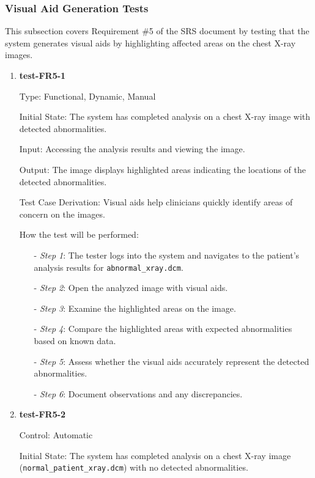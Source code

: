 \documentclass[12pt, titlepage]{article}
\begin{document}
\subsubsection{ Visual Aid Generation Tests}

This subsection covers Requirement \#5 of the SRS document by testing that the system generates visual aids by highlighting affected areas on the chest X-ray images.

\begin{enumerate}

\item \textbf{test-FR5-1} \label{test-FR5-1}

Type: Functional, Dynamic, Manual

Initial State: The system has completed analysis on a chest X-ray image with detected abnormalities.

Input: Accessing the analysis results and viewing the image.

Output: The image displays highlighted areas indicating the locations of the detected abnormalities.

Test Case Derivation: Visual aids help clinicians quickly identify areas of concern on the images.

How the test will be performed:
\begin{itemize}
  \item[-] \textit{Step 1}: The tester logs into the system and navigates to the patient's analysis results for \texttt{abnormal\_xray.dcm}.
  \item[-] \textit{Step 2}: Open the analyzed image with visual aids.
  \item[-] \textit{Step 3}: Examine the highlighted areas on the image.
  \item[-] \textit{Step 4}: Compare the highlighted areas with expected abnormalities based on known data.
  \item[-] \textit{Step 5}: Assess whether the visual aids accurately represent the detected abnormalities.
  \item[-] \textit{Step 6}: Document observations and any discrepancies.
\end{itemize}

\item \textbf{test-FR5-2} \label{test-FR5-2}

Control: Automatic

Initial State: The system has completed analysis on a chest X-ray image (\texttt{normal\_patient\_xray.dcm}) with no detected abnormalities.


\end{enumerate}
\end{document}
